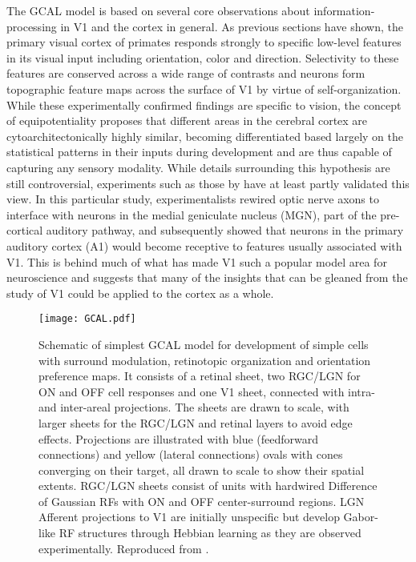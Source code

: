 The GCAL model is based on several core observations about
information-processing in V1 and the cortex in general. As previous
sections have shown, the primary visual cortex of primates responds
strongly to specific low-level features in its visual input including
orientation, color and direction. Selectivity to these features are
conserved across a wide range of contrasts and neurons form
topographic feature maps across the surface of V1 by virtue of
self-organization. While these experimentally confirmed findings are
specific to vision, the concept of equipotentiality proposes that
different areas in the cerebral cortex are cytoarchitectonically
highly similar, becoming differentiated based largely on the
statistical patterns in their inputs during development and are thus
capable of capturing any sensory modality. While details surrounding
this hypothesis are still controversial, experiments such as those by
\cite{Sur1990} have at least partly validated this view. In this
particular study, experimentalists rewired optic nerve axons to
interface with neurons in the medial geniculate nucleus (MGN), part of
the pre-cortical auditory pathway, and subsequently showed that
neurons in the primary auditory cortex (A1) would become receptive to
features usually associated with V1. This is behind much of what has
made V1 such a popular model area for neuroscience and suggests that
many of the insights that can be gleaned from the study of V1 could be
applied to the cortex as a whole.

\begin{figure}
	\centering \texttt{[image: GCAL.pdf]}
	\caption[Schematic representation of the GCAL model. Reproduced
      from \cite{Stevens2013}.]{Schematic of simplest GCAL model for
      development of simple cells with surround modulation,
      retinotopic organization and orientation preference maps. It
      consists of a retinal sheet, two RGC/LGN for ON and OFF cell
      responses and one V1 sheet, connected with intra- and
      inter-areal projections. The sheets are drawn to scale, with
      larger sheets for the RGC/LGN and retinal layers to avoid edge
      effects. Projections are illustrated with blue (feedforward
      connections) and yellow (lateral connections) ovals with cones
      converging on their target, all drawn to scale to show their
      spatial extents. RGC/LGN sheets consist of units with hardwired
      Difference of Gaussian RFs with ON and OFF center-surround
      regions. LGN Afferent projections to V1 are initially unspecific
      but develop Gabor-like RF structures through Hebbian learning as
      they are observed experimentally. Reproduced from
      \cite{Stevens2013}.}
	\label{GCAL}
\end{figure}

